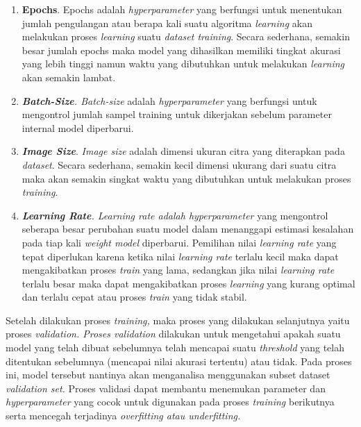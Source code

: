 \begin{enumerate}[nolistsep]
    \item \textbf{Epochs}. Epochs adalah \textit{hyperparameter} yang berfungsi untuk menentukan jumlah pengulangan atau berapa kali suatu algoritma \textit{learning} akan melakukan proses \textit{learning} suatu \textit{dataset training}. Secara sederhana, semakin besar jumlah epochs maka model yang dihasilkan memiliki tingkat akurasi yang lebih tinggi namun waktu yang dibutuhkan untuk melakukan \textit{learning} akan semakin lambat. 
    \item \textit{\textbf{Batch-Size}. Batch-size} adalah \textit{hyperparameter} yang berfungsi untuk mengontrol jumlah sampel training untuk dikerjakan sebelum parameter internal model diperbarui. 
    \item \textit{\textbf{Image Size}}. \textit{Image size} adalah dimensi ukuran citra yang diterapkan pada \textit{dataset}. Secara sederhana, semakin kecil dimensi ukurang dari suatu citra maka akan semakin singkat waktu yang dibutuhkan untuk melakukan proses \textit{training}.
    \item \textit{\textbf{Learning Rate}. Learning rate \textnormal{adalah} hyperparameter} yang mengontrol seberapa besar perubahan suatu model dalam menanggapi estimasi kesalahan pada tiap kali \textit{weight model} diperbarui. Pemilihan nilai \textit{learning rate} yang tepat diperlukan karena ketika nilai \textit{learning rate} terlalu kecil maka dapat mengakibatkan proses \textit{train} yang lama, sedangkan jika nilai \textit{learning rate} terlalu besar maka dapat mengakibatkan proses \textit{learning} yang kurang optimal dan terlalu cepat atau proses \textit{train} yang tidak stabil.
\end{enumerate}


Setelah dilakukan proses \textit{training,} maka proses yang dilakukan selanjutnya yaitu proses \textit{validation. \textnormal{Proses} validation} dilakukan untuk mengetahui apakah suatu model yang telah dibuat sebelumnya telah mencapai suatu \textit{threshold} yang telah ditentukan sebelumnya (mencapai nilai akurasi tertentu) atau tidak. Pada proses ini, model tersebut nantinya akan menganalisa menggunakan subset dataset \textit{validation set.} Proses validasi dapat membantu menemukan parameter dan \textit{hyperparameter} yang cocok untuk digunakan pada proses \textit{training} berikutnya serta mencegah terjadinya \textit{overfitting \textnormal{atau} underfitting.}


